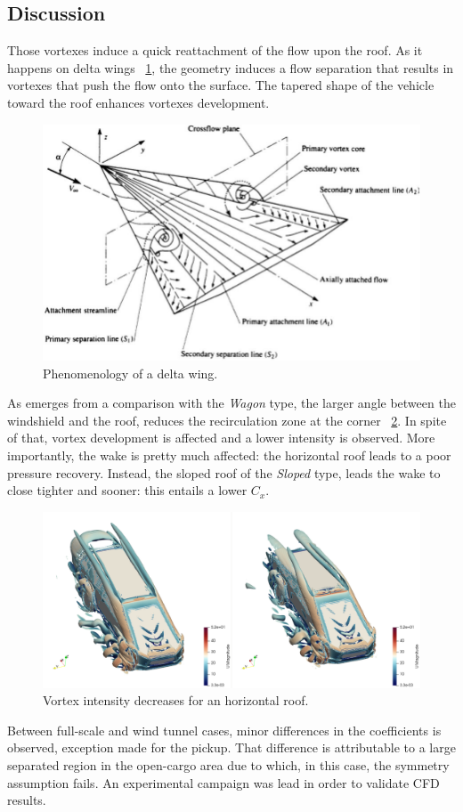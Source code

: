 \documentclass{elbioimp2}
\begin{document}
\subsection{Discussion}
Those vortexes induce a quick reattachment of the flow upon the roof. As it happens on delta wings ~\ref{delta}, the geometry induces a flow separation that results in vortexes that push the flow onto the surface. The tapered shape of the vehicle toward the roof enhances vortexes development. 
\begin{figure}[htp]
  \centering
  \includegraphics[width=0.9\columnwidth]{delta.jpg}
  \caption{Phenomenology of a delta wing.\label{delta}}
\end{figure}
As emerges from a comparison with the \emph{Wagon} type, the larger angle between the windshield and the roof, reduces the recirculation zone at the corner ~\ref{sloped&wagon}. In spite of that, vortex development is affected and a lower intensity is observed. More importantly, the wake is pretty much affected: the horizontal roof leads to a poor pressure recovery. Instead, the sloped roof of the \emph{Sloped} type, leads the wake to close tighter and sooner: this entails a lower $C_x$.
\begin{figure}[htp]
  \centering
  \includegraphics[width=0.9\columnwidth]{sloped&wagon.png}
  \caption{Vortex intensity decreases for an horizontal roof.\label{sloped&wagon}}
\end{figure}
Between full-scale and wind tunnel cases, minor differences in the coefficients is observed, exception made for the pickup. That difference is attributable to a large separated region in the open-cargo area due to which, in this case, the symmetry assumption fails.
An experimental campaign was lead in order to validate CFD results. 
\end{document}
